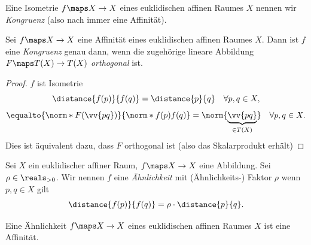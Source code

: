 \begin{definition*}
  Eine Isometrie \( f\maps X\to X \) eines euklidischen affinen Raumes \( X \) nennen wir \emph{Kongruenz} (also nach  immer eine Affinität).
\end{definition*}
\begin{lemma}
  Sei \( f\maps X\to X \) eine Affinität eines euklidischen affinen Raumes \( X \). Dann ist \( f \) eine \emph{Kongruenz} genau dann, wenn die zugehörige lineare Abbildung \( F\maps T(X)\to T(X) \) \emph{orthogonal} ist.
\end{lemma}
\begin{proof}
  \( f  \) ist Isometrie \gdw
  \begin{equation*}
    \distance{f(p)}{f(q)}=\distance{p}{q}\quad \forall p,q\in X,
  \end{equation*}
  \dh \gdw
  \begin{equation*}
    \equalto{\norm*{F(\vv{pq})}}{\norm*{f(p)f(q)}}=\norm{\underbrace{\vv{pq}}_{\in T(X)}} \quad \forall p,q\in X.
  \end{equation*}
  Dies ist äquivalent dazu, dass \( F \) orthogonal ist (also das Skalarprodukt erhält)
\end{proof}
\begin{definition*}
  Sei \( X \) ein euklidischer affiner Raum, \( f\maps X\to X \) eine Abbildung. Sei \( \rho\in \reals_{>0} \). Wir nennen \( f  \) eine \emph{Ähnlichkeit} mit (Ähnlichkeits-) Faktor \( \rho \) wenn \tforall  \( p,q\in X \) gilt
  \begin{equation*}
    \distance{f(p)}{f(q)}=\rho\cdot \distance{p}{q}.
  \end{equation*}
\end{definition*}
\begin{korollar*}
  Eine Ähnlichkeit \( f\maps X\to X \) eines euklidischen affinen Raumes \( X \) ist eine Affinität.
\end{korollar*}
